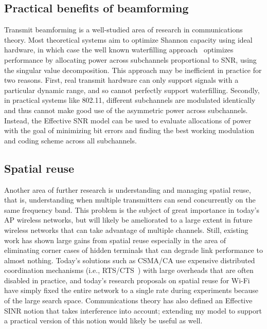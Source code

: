 \subsection{Practical benefits of beamforming}
Transmit beamforming is a well-studied area of research in communications theory. Most theoretical systems aim to optimize Shannon capacity using ideal hardware, in which case the well known waterfilling approach~\cite[p. 183]{Tse} optimizes performance by allocating power across subchannels proportional to SNR, using the singular value decomposition. This approach may be inefficient in practice for two reasons. First, real transmit hardware can only support signals with a particular dynamic range, and so cannot perfectly support waterfilling. Secondly, in practical systems like 802.11, different subchannels are modulated identically and thus cannot make good use of the asymmetric power across subchannels. Instead, the Effective SNR model can be used to evaluate allocations of power with the goal of minimizing bit errors and finding the best working modulation and coding scheme across all subchannels.

\subsection{Spatial reuse}
Another area of further research is understanding and managing spatial reuse, that is, understanding when multiple transmitters can send concurrently on the same frequency band. This problem is the subject of great importance in today's AP wireless networks, but will likely be ameliorated to a large extent in future wireless networks that can take advantage of multiple channels. Still, existing work has shown large gains from spatial reuse especially in the area of eliminating corner cases of hidden terminals that can degrade link performance to almost nothing. Today's solutions such as CSMA/CA use expensive distributed coordination mechanisms (i.e., RTS/CTS~\cite{Karn_MACA}) with large overheads that are often disabled in practice, and today's research proposals on spatial reuse for Wi-Fi~\cite{Shrivastava_CENTAUR,Vutukuru_CMAP} have simply fixed the entire network to a single rate during experiments because of the large search space. Communications theory has also defined an Effective SINR notion that takes interference into account; extending my model to support a practical version of this notion would likely be useful as well.

